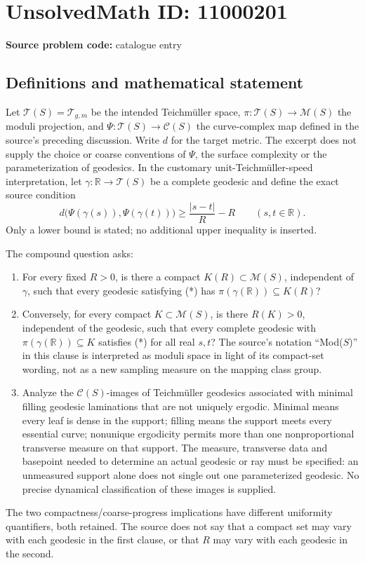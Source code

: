 \documentclass[11pt]{article}
\newcommand{\R}{\mathbb{R}}
\begin{document}
\section*{UnsolvedMath ID: 11000201}
\textbf{Source problem code:} catalogue entry
\subsection{Definitions and mathematical statement}
Let \(\mathcal T(S)=\mathcal T_{g,m}\) be the intended Teichm\"uller space, \(\pi:\mathcal T(S)\to\mathcal M(S)\) the moduli projection, and \(\Psi:\mathcal T(S)\to\mathcal C(S)\) the curve-complex map defined in the source's preceding discussion. Write \(d\) for the target metric. The excerpt does not supply the choice or coarse conventions of \(\Psi\), the surface complexity or the parameterization of geodesics. In the customary unit-Teichm\"uller-speed interpretation, let \(\gamma:\R\to\mathcal T(S)\) be a complete geodesic and define the exact source condition
\[d\bigl(\Psi(\gamma(s)),\Psi(\gamma(t))\bigr)\geq\frac{|s-t|}{R}-R\qquad(s,t\in\R).\tag{*}\]
Only a lower bound is stated; no additional upper inequality is inserted.

The compound question asks:
\begin{enumerate}
\item For every fixed \(R>0\), is there a compact \(K(R)\subset\mathcal M(S)\), independent of \(\gamma\), such that every geodesic satisfying (*) has \(\pi(\gamma(\R))\subseteq K(R)\)?
\item Conversely, for every compact \(K\subset\mathcal M(S)\), is there \(R(K)>0\), independent of the geodesic, such that every complete geodesic with \(\pi(\gamma(\R))\subseteq K\) satisfies (*) for all real \(s,t\)? The source's notation ``Mod(\(S\))'' in this clause is interpreted as moduli space in light of its compact-set wording, not as a new sampling measure on the mapping class group.
\item Analyze the \(\mathcal C(S)\)-images of Teichm\"uller geodesics associated with minimal filling geodesic laminations that are not uniquely ergodic. Minimal means every leaf is dense in the support; filling means the support meets every essential curve; nonunique ergodicity permits more than one nonproportional transverse measure on that support. The measure, transverse data and basepoint needed to determine an actual geodesic or ray must be specified: an unmeasured support alone does not single out one parameterized geodesic. No precise dynamical classification of these images is supplied.
\end{enumerate}
The two compactness/coarse-progress implications have different uniformity quantifiers, both retained. The source does not say that a compact set may vary with each geodesic in the first clause, or that \(R\) may vary with each geodesic in the second.
\end{document}

